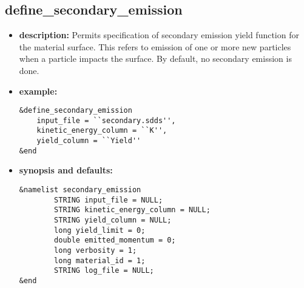 %
\newpage

\subsection{define\_secondary\_emission}

\begin{itemize}

\item {\bf description:} Permits specification of secondary emission
yield function for the material surface.  This refers to emission of
one or more new particles when a particle impacts the surface.  By
default, no secondary emission is done.

\item {\bf example:} 
\begin{verbatim}
&define_secondary_emission
    input_file = ``secondary.sdds'',
    kinetic_energy_column = ``K'',
    yield_column = ``Yield''
&end
\end{verbatim}

\item {\bf synopsis and defaults:} 
\begin{verbatim}
&namelist secondary_emission
        STRING input_file = NULL;
        STRING kinetic_energy_column = NULL;
        STRING yield_column = NULL;
        long yield_limit = 0;
        double emitted_momentum = 0;
        long verbosity = 1;
        long material_id = 1;
        STRING log_file = NULL;
&end
\end{verbatim}


\end{itemize}
